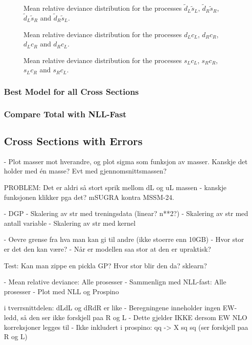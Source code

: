 \documentclass[twoside,english]{uiofysmaster}
\begin{document}
\begin{figure}
\caption{Mean relative deviance distribution for the processes $\tilde{d}_L\tilde{s}_L$, $\tilde{d}_R\tilde{s}_R$, $\tilde{d}_L\tilde{s}_R$ and $\tilde{d}_R\tilde{s}_L$.}
\end{figure}

\begin{figure}
\caption{Mean relative deviance distribution for the processes $d_Lc_L$, $d_Rc_R$, $d_Lc_R$ and $d_Rc_L$.}
\end{figure}

\begin{figure}
\caption{Mean relative deviance distribution for the processes $s_Lc_L$, $s_Rc_R$, $s_Lc_R$ and $s_Rc_L$.}
\end{figure}

\subsubsection{Best Model for all Cross Sections}
\subsubsection{Compare Total with NLL-Fast}

\subsection{Cross Sections with Errors}

- Plot masser mot hverandre, og plot sigma som funksjon av masser. Kanskje det holder med én masse? Evt med gjennomsnittsmassen?

PROBLEM: Det er aldri så stort sprik mellom dL og uL massen - kanskje funksjonen klikker pga det? mSUGRA kontra MSSM-24.


- DGP
- Skalering av str med treningsdata (linear? n**2?)
- Skalering av str med antall variable
- Skalering av str med kernel

- Oevre grense fra hva man kan gi til andre (ikke stoerre enn 10GB)
- Hvor stor er det den kan være?
- Når er modellen saa stor at den er upraktisk?

Test: Kan man zippe en pickla GP? Hvor stor blir den da? sklearn?

- Mean relative deviance: Alle prosesser
- Sammenlign med NLL-fast: Alle prosesser
- Plot med NLL og Prospino

i tverrsnittdelen:
dLdL og dRdR er like
- Beregningene inneholder ingen EW-ledd, så den ser ikke forskjell paa R og L
- Dette gjelder IKKE dersom EW NLO korreksjoner legges til
- Ikke inkludert i prospino: qq -> X sq sq (ser forskjell paa R og L)
\end{document}
